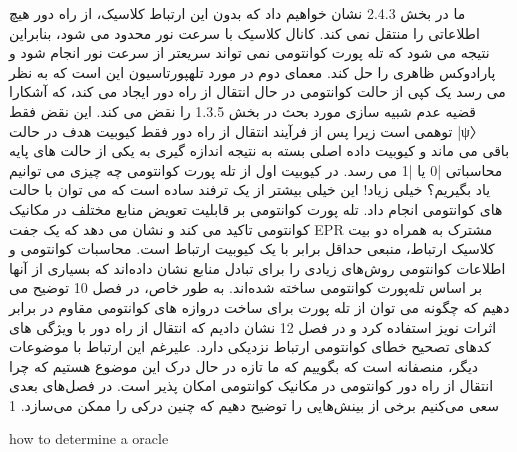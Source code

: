 \documentclass{book}
\begin{document}
ما در بخش 2.4.3 نشان خواهیم داد که بدون این ارتباط کلاسیک، از راه دور هیچ اطلاعاتی را منتقل نمی کند. کانال کلاسیک با سرعت نور محدود می شود، بنابراین نتیجه می شود که تله پورت کوانتومی نمی تواند سریعتر از سرعت نور انجام شود و پارادوکس ظاهری را حل کند. معمای دوم در مورد تلهپورتاسیون این است که به نظر می رسد یک کپی از حالت کوانتومی در حال انتقال از راه دور ایجاد می کند، که آشکارا قضیه عدم شبیه سازی مورد بحث در بخش 1.3.5 را نقض می کند. این نقض فقط توهمی است زیرا پس از فرآیند انتقال از راه دور فقط کیوبیت هدف در حالت |ψ〉 باقی می ماند و کیوبیت داده اصلی بسته به نتیجه اندازه گیری به یکی از حالت های پایه محاسباتی |0 یا |1 می رسد. در کیوبیت اول از تله پورت کوانتومی چه چیزی می توانیم یاد بگیریم؟ خیلی زیاد! این خیلی بیشتر از یک ترفند ساده است که می توان با حالت های کوانتومی انجام داد. تله پورت کوانتومی بر قابلیت تعویض منابع مختلف در مکانیک کوانتومی تاکید می کند و نشان می دهد که یک جفت EPR مشترک به همراه دو بیت کلاسیک ارتباط، منبعی حداقل برابر با یک کیوبیت ارتباط است. محاسبات کوانتومی و اطلاعات کوانتومی روش‌های زیادی را برای تبادل منابع نشان داده‌اند که بسیاری از آنها بر اساس تله‌پورت کوانتومی ساخته شده‌اند. به طور خاص، در فصل 10 توضیح می دهیم که چگونه می توان از تله پورت برای ساخت دروازه های کوانتومی مقاوم در برابر اثرات نویز استفاده کرد و در فصل 12 نشان دادیم که انتقال از راه دور با ویژگی های کدهای تصحیح خطای کوانتومی ارتباط نزدیکی دارد. علیرغم این ارتباط با موضوعات دیگر، منصفانه است که بگوییم که ما تازه در حال درک این موضوع هستیم که چرا انتقال از راه دور کوانتومی در مکانیک کوانتومی امکان پذیر است. در فصل‌های بعدی سعی می‌کنیم برخی از بینش‌هایی را توضیح دهیم که چنین درکی را ممکن می‌سازد. 1

\newpage
how to determine a oracle\\
	
	
	
	
	
	
	
\end{document}
